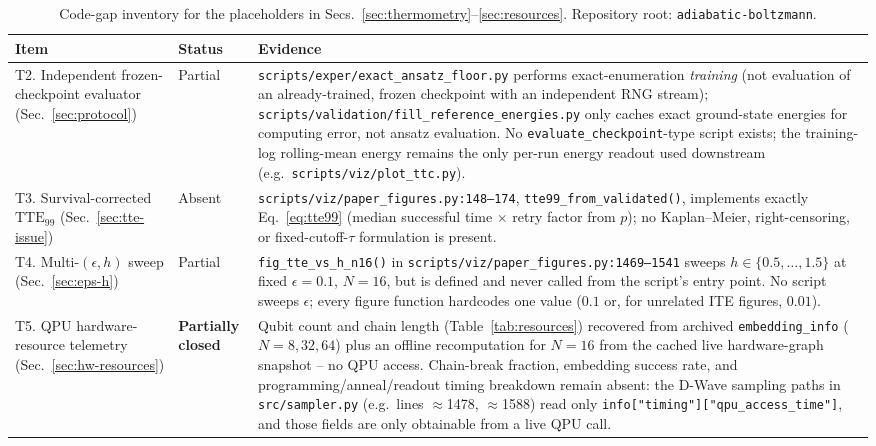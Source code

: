 \begin{table}[t]
\caption{Code-gap inventory for the placeholders in Secs.~\ref{sec:thermometry}--\ref{sec:resources}. Repository root: \texttt{adiabatic-boltzmann}.}
\label{tab:codegaps}
\begin{ruledtabular}
\begin{tabular}{lp{}p{}}
Item & Status & Evidence \\
\hline
T2. Independent frozen-checkpoint evaluator (Sec.~\ref{sec:protocol}) & Partial & \texttt{scripts/exper/exact\_ansatz\_floor.py} performs exact-enumeration \emph{training} (not evaluation of an already-trained, frozen checkpoint with an independent RNG stream); \texttt{scripts/validation/fill\_reference\_energies.py} only caches exact ground-state energies for computing error, not ansatz evaluation. No \texttt{evaluate\_checkpoint}-type script exists; the training-log rolling-mean energy remains the only per-run energy readout used downstream (e.g.\ \texttt{scripts/viz/plot\_ttc.py}). \\
T3. Survival-corrected $\mathrm{TTE}_{99}$ (Sec.~\ref{sec:tte-issue}) & Absent & \texttt{scripts/viz/paper\_figures.py:148--174}, \texttt{tte99\_from\_validated()}, implements exactly Eq.~\eqref{eq:tte99} (median successful time $\times$ retry factor from $p$); no Kaplan--Meier, right-censoring, or fixed-cutoff-$\tau$ formulation is present. \\
T4. Multi-$(\epsilon,h)$ sweep (Sec.~\ref{sec:eps-h}) & Partial & \texttt{fig\_tte\_vs\_h\_n16()} in \texttt{scripts/viz/paper\_figures.py:1469--1541} sweeps $h\in\{0.5,\dots,1.5\}$ at fixed $\epsilon=0.1$, $N=16$, but is defined and never called from the script's entry point. No script sweeps $\epsilon$; every figure function hardcodes one value ($0.1$ or, for unrelated ITE figures, $0.01$). \\
T5. QPU hardware-resource telemetry (Sec.~\ref{sec:hw-resources}) & \textbf{Partially closed} & Qubit count and chain length (Table~\ref{tab:resources}) recovered from archived \texttt{embedding\_info} ($N=8,32,64$) plus an offline recomputation for $N=16$ from the cached live hardware-graph snapshot -- no QPU access. Chain-break fraction, embedding success rate, and programming/anneal/readout timing breakdown remain absent: the D-Wave sampling paths in \texttt{src/sampler.py} (e.g.\ lines $\approx$1478, $\approx$1588) read only \texttt{info["timing"]["qpu\_access\_time"]}, and those fields are only obtainable from a live QPU call. \\

\end{tabular}
\end{ruledtabular}
\end{table}
